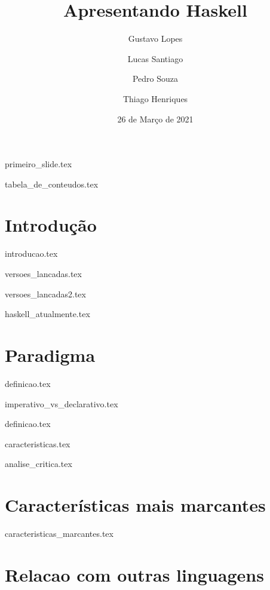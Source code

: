 \documentclass[aspectratio=169]{beamer}
\title{Apresentando Haskell}
\author{Gustavo Lopes \and Lucas Santiago \and Pedro Souza \and Thiago Henriques }
\institute{Pontifícia Universidade Católica de Minas Gerais}
\date{26 de Março de 2021}
\begin{document}
    {primeiro_slide.tex}

    {tabela_de_conteudos.tex}


    \section{Introdução}

    {introducao.tex}

    {versoes_lancadas.tex}

    {versoes_lancadas2.tex}

    {haskell_atualmente.tex}

    \section{Paradigma}

    {definicao.tex}

    {imperativo_vs_declarativo.tex}
    
    {definicao.tex}

    {caracteristicas.tex}

    {analise_critica.tex}


    \section{Características mais marcantes}

    {caracteristicas_marcantes.tex}


    \section{Relacao com outras linguagens}
\end{document}
